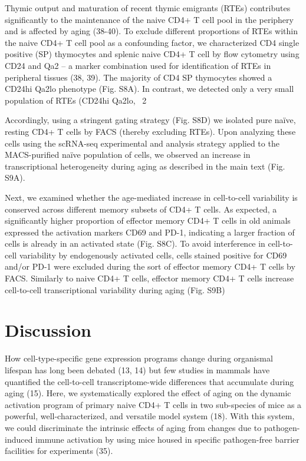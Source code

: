 Thymic output and maturation of recent thymic emigrants (RTEs) contributes significantly to the maintenance of the naive CD4+ T cell pool in the periphery and is affected by aging (38-40). To exclude different proportions of RTEs within the naive CD4+ T cell pool as a confounding factor, we characterized CD4 single positive (SP) thymocytes and splenic naive CD4+ T cell by flow cytometry using CD24 and Qa2 – a marker combination used for identification of RTEs in peripheral tissues (38, 39). The majority of CD4 SP thymocytes showed a CD24hi Qa2lo phenotype (Fig. S8A). In contrast, we detected only a very small population of RTEs (CD24hi Qa2lo, ~2%

Accordingly, using a stringent gating strategy (Fig. S8D) we isolated pure naïve, resting CD4+ T cells by FACS (thereby excluding RTEs). Upon analyzing these cells using the scRNA-seq experimental and analysis strategy applied to the MACS-purified naïve population of cells, we observed an increase in transcriptional heterogeneity during aging as described in the main text (Fig. S9A). 

Next, we examined whether the age-mediated increase in cell-to-cell variability is conserved across different memory subsets of CD4+ T cells. As expected, a significantly higher proportion of effector memory CD4+ T cells in old animals expressed the activation markers CD69 and PD-1, indicating a larger fraction of cells is already in an activated state (Fig. S8C).  To avoid interference in cell-to-cell variability by endogenously activated cells, cells stained positive for CD69 and/or PD-1 were excluded during the sort of effector memory CD4+ T cells by FACS. Similarly to naive CD4+ T cells, effector memory CD4+ T cells increase cell-to-cell transcriptional variability during aging (Fig. S9B) 

\section{Discussion}

How cell-type-specific gene expression programs change during organismal lifespan has long been debated (13, 14) but few studies in mammals have quantified the cell-to-cell transcriptome-wide differences that accumulate during aging (15). Here, we systematically explored the effect of aging on the dynamic activation program of primary naive CD4+ T cells in two sub-species of mice as a powerful, well-characterized, and versatile model system (18). With this system, we could discriminate the intrinsic effects of aging from changes due to pathogen-induced immune activation by using mice housed in specific pathogen-free barrier facilities for experiments (35).

